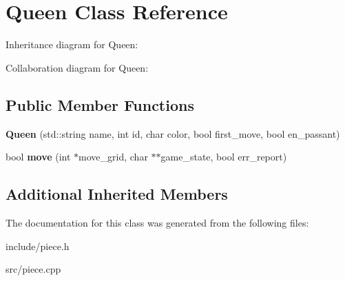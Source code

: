 \hypertarget{classQueen}{}\section{Queen Class Reference}
\label{classQueen}


Inheritance diagram for Queen\+:


Collaboration diagram for Queen\+:
\subsection*{Public Member Functions}
\begin{DoxyCompactItemize}
\item 
\mbox{\label{classQueen_aa4723c77f04335036475d943c66f6657}} 
{\bfseries Queen} (std\+::string name, int id, char color, bool first\+\_\+move, bool en\+\_\+passant)
\item 
\mbox{\label{classQueen_a5c3bc9c4bf72b47e30d3d7171241aac0}} 
bool {\bfseries move} (int $\ast$move\+\_\+grid, char $\ast$$\ast$game\+\_\+state, bool err\+\_\+report)
\end{DoxyCompactItemize}
\subsection*{Additional Inherited Members}


The documentation for this class was generated from the following files\+:\begin{DoxyCompactItemize}
\item 
include/piece.\+h\item 
src/piece.\+cpp\end{DoxyCompactItemize}
